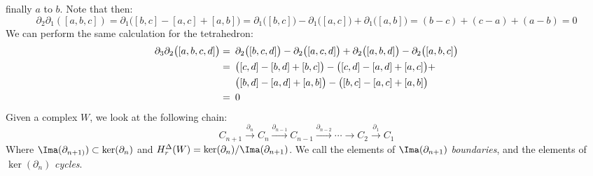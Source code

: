 \documentclass[crop=false,class=book,oneside]{standalone}
\begin{document}
                finally $a$ to $b$. Note that then:
                \begin{equation*}
                    \partial_{2}\partial_{1}([a,b,c])
                    =\partial_{1}\big([b,c]-[a,c]+[a,b]\big)
                    =\partial_{1}\big([b,c]\big)
                    -\partial_{1}\big([a,c]\big)
                    +\partial_{1}\big([a,b]\big)
                    =(b-c)+(c-a)+(a-b)=0
                \end{equation*}
                We can perform the same calculation for the tetrahedron:
                \begin{align*}
                    \partial_{3}\partial_{2}\big([a,b,c,d]\big)
                    =&\hspace{0.5em}\partial_{2}\big([b,c,d]\big)
                     -\partial_{2}\big([a,c,d]\big)
                     +\partial_{2}\big([a,b,d]\big)
                     -\partial_{2}\big([a,b,c]\big)\\
                    =&\hspace{0.5em}\big([c,d]-[b,d]+[b,c]\big)
                     -\big([c,d]-[a,d]+[a,c]\big)+\\
                    &\hspace{0.5em}\big([b,d]-[a,d]+[a,b]\big)
                     -\big([b,c]-[a,c]+[a,b]\big)\\
                    =&\hspace{0.5em}0
                \end{align*}
                Given a complex $W$, we look at the following chain:
                \begin{equation*}
                    C_{n+1}\overset{\partial_{n}}{\longrightarrow}
                    C_{n}\overset{\partial_{n-1}}{\longrightarrow}
                    C_{n-1}\overset{\partial_{n-2}}{\longrightarrow}
                    \cdots\longrightarrow
                    C_{2}\overset{\partial_{1}}{\longrightarrow}C_{1}
                \end{equation*}
                Where $\Ima(\partial_{n+1)})\subset\ker(\partial_{n})$
                and $H_{r}^{\Delta}(W)=\ker(\partial_{n})/\Ima(\partial_{n+1})$.
                We call the elements of $\Ima(\partial_{n+1})$
                \textit{boundaries}, and the elements of
                $\ker(\partial_{n})$ \textit{cycles}.
\end{document}
